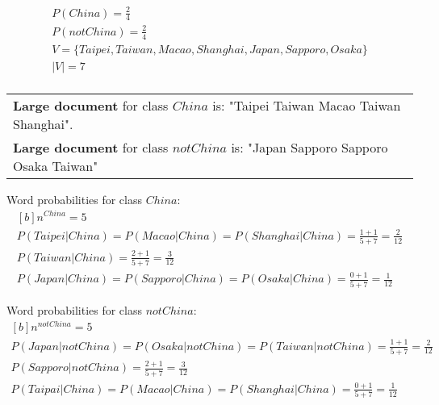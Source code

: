 \documentclass{article}
\begin{document}
\begin{multline}\\
	P(China) = \frac{2}{4} \\
	P(notChina) = \frac{2}{4} \\
	V = \lbrace Taipei, Taiwan, Macao, Shanghai, Japan, Sapporo, Osaka \rbrace \\
	|V| = 7 \\
\label{eq:example-class-prob}
\end{multline}

\begin{tabular}{l}
\textbf{Large document} for class $China$ is: "Taipei Taiwan Macao Taiwan Shanghai". \\
\textbf{Large document} for class $notChina$ is: "Japan Sapporo Sapporo Osaka Taiwan" \\
\end{tabular}

\hspace{2pt}

Word probabilities for class $China$:
\begin{equation}
\begin{aligned}[b]
n^{China} = 5 \\
P(Taipei|China) = P(Macao|China) = P(Shanghai|China) = \frac{1 + 1}{5 + 7} = \frac{2}{12} \\
P(Taiwan|China) = \frac{2 + 1}{5 + 7} = \frac{3}{12} \\
P(Japan|China) = P(Sapporo|China) = P(Osaka|China) = \frac{0 + 1}{5 + 7} = \frac{1}{12}
\end{aligned}
\end{equation}

Word probabilities for class $notChina$:
\begin{equation}
\begin{aligned}[b]
n^{notChina} = 5 \\
P(Japan|notChina) = P(Osaka|notChina) = P(Taiwan|notChina) = \frac{1 + 1}{5 + 7} = \frac{2}{12} \\
P(Sapporo|notChina) = \frac{2 + 1}{5 + 7} = \frac{3}{12} \\
P(Taipai|China) = P(Macao|China) = P(Shanghai|China) = \frac{0 + 1}{5 + 7} = \frac{1}{12} \\
\end{aligned}
\end{equation}
\end{document}
